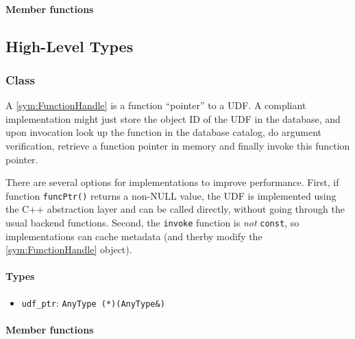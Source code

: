\paragraph{Member functions}


\subsection{High-Level Types}

\subsubsection[Class FunctionHandle]{Class }

A \ref{sym:FunctionHandle} is a function ``pointer'' to a UDF. A compliant implementation might just store the object ID of the UDF in the database, and upon invocation look up the function in the database catalog, do argument verification, retrieve a function pointer in memory and finally invoke this function pointer.

There are several options for implementations to improve performance. First, if function \texttt{funcPtr()} returns a non-NULL value, the UDF is implemented using the C++ abstraction layer and can be called directly, without going through the usual backend functions. Second, the \texttt{invoke} function is \emph{not} \texttt{const}, so implementations can cache metadata (and therby modify the \ref{sym:FunctionHandle} object).

\paragraph{Types}

\begin{itemize}
	\item
		\texttt{udf\_ptr}: \texttt{AnyType (*)(AnyType\&)}
\end{itemize}

\paragraph{Member functions}

